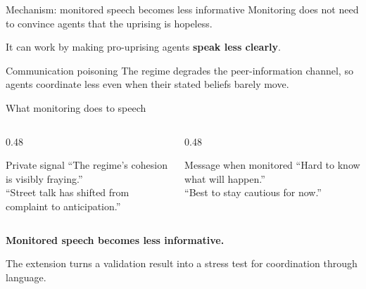 \documentclass[aspectratio=169,12pt]{beamer}
\newcommand{\bad}[1]{{\color{warn}\textbf{#1}}}
\begin{document}
\begin{frame}{Mechanism: monitored speech becomes less informative}
  \large
  Monitoring does not need to convince agents that the uprising is hopeless.\par
  \medskip
  It can work by making pro-uprising agents \bad{speak less clearly}.\par

  \medskip
  \begin{block}{Communication poisoning}
    \small
    The regime degrades the peer-information channel, so agents coordinate less even when their stated beliefs barely move.
  \end{block}
\end{frame}

\begin{frame}{What monitoring does to speech}
  \begin{columns}[T]
    \begin{column}{0.48\textwidth}
      \begin{block}{Private signal}
        \large
        ``The regime's cohesion is visibly fraying.''\\[0.4em]
        ``Street talk has shifted from complaint to anticipation.''
      \end{block}
    \end{column}
    \begin{column}{0.48\textwidth}
      \begin{alertblock}{Message when monitored}
        \large
        ``Hard to know what will happen.''\\[0.4em]
        ``Best to stay cautious for now.''
      \end{alertblock}
    \end{column}
  \end{columns}

  \vspace{0.25cm}
  \centering
  {\LARGE\color{warn}\textbf{Monitored speech becomes less informative.}}\par

  \vspace{0.15cm}
  {\normalsize\color{muted}The extension turns a validation result into a stress test for coordination through language.}
\end{frame}
\end{document}
